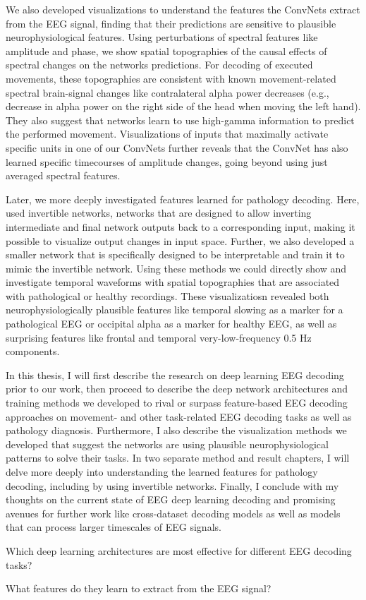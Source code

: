 We also developed visualizations to understand the features the ConvNets
extract from the EEG signal, finding that their predictions are
sensitive to plausible neurophysiological features. Using perturbations
of spectral features like amplitude and phase, we show spatial topographies of
the causal effects of spectral changes on the networks predictions. For
decoding of executed movements, these topographies are consistent with
known movement-related spectral brain-signal changes like contralateral
alpha power decreases (e.g., decrease in alpha power on the right side
of the head when moving the left hand). They also suggest that networks
learn to use high-gamma information to predict the performed movement.
Visualizations of inputs that maximally activate specific units in one
of our ConvNets further reveals that the ConvNet has also learned
specific timecourses of amplitude changes, going beyond using just
averaged spectral features.

Later, we more deeply investigated features learned for pathology
decoding. Here, used invertible networks, networks that are
designed to allow inverting intermediate and final network outputs
back to a corresponding input, making it possible to visualize output changes in input space. Further, we also developed a smaller network that is
specifically designed to be interpretable and train it to mimic the
invertible network. Using these methods we could directly show and
investigate temporal waveforms with spatial topographies that are
associated with pathological or healthy recordings. These visualizatiosn
revealed both neurophysiologically plausible features like temporal
slowing as a marker for a pathological EEG or occipital alpha as a
marker for healthy EEG, as well as surprising features like frontal and
temporal very-low-frequency 0.5 Hz components.

    In this thesis, I will first describe the research on deep learning EEG
decoding prior to our work, then proceed to describe the deep network
architectures and training methods we developed to rival or surpass
feature-based EEG decoding approaches on movement- and other
task-related EEG decoding tasks as well as pathology diagnosis.
Furthermore, I also describe the visualization methods we developed that
suggest the networks are using plausible neurophysiological patterns to
solve their tasks. In two separate method and result chapters, I will
delve more deeply into understanding the learned features for pathology
decoding, including by using invertible networks. Finally, I conclude
with my thoughts on the current state of EEG deep learning decoding and
promising avenues for further work like cross-dataset decoding models as
well as models that can process larger timescales of EEG signals.

\begin{openbox}
\item Which deep learning architectures are most effective for different EEG decoding tasks?
\item What features do they learn to extract from the EEG signal?
\end{openbox}
